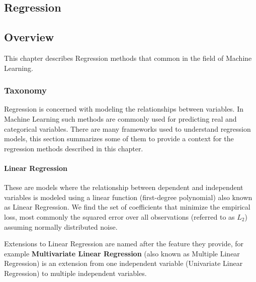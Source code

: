 

\renewcommand{\bibsection}{\subsection{\bibname}}
\begin{bibunit}

\chapter{Regression}
\label{ch:regression}

\section{Overview}
This chapter describes Regression methods that common in the field of Machine Learning.

\subsection{Taxonomy}
Regression is concerned with modeling the relationships between variables. In Machine Learning such methods are commonly used for predicting real and categorical variables. There are many frameworks used to understand regression models, this section summarizes some of them to provide a context for the regression methods described in this chapter.

\subsubsection{Linear Regression}
These are models where the relationship between dependent and independent variables is modeled using a linear function (first-degree polynomial) also known as Linear Regression. We find the set of coefficients that minimize the empirical loss, most commonly the squared error over all observations (referred to as $L_2$) assuming normally distributed noise. 

Extensions to Linear Regression are named after the feature they provide, for example \textbf{Multivariate Linear Regression} (also known as Multiple Linear Regression) is an extension from one independent variable (Univariate Linear Regression) to multiple independent variables.


\end{bibunit}
